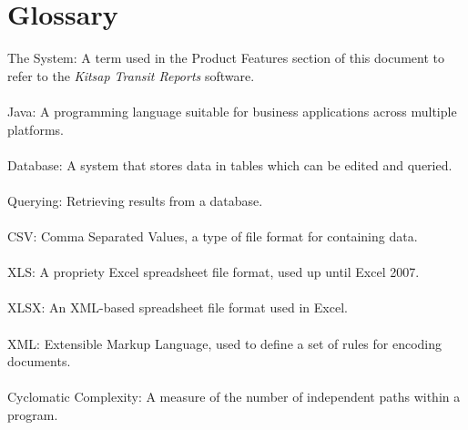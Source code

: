 \section{Glossary}
The System: A term used in the Product Features section of this document to refer to the \textit{Kitsap Transit Reports} software.\\\\
Java: A programming language suitable for business applications across multiple platforms.\\\\
Database: A system that stores data in tables which can be edited and queried.\\\\
Querying: Retrieving results from a database.\\\\
CSV: Comma Separated Values, a type of file format for containing data.\\\\
XLS: A propriety Excel spreadsheet file format, used up until Excel 2007.\\\\
XLSX: An XML-based spreadsheet file format used in Excel.\\\\
XML: Extensible Markup Language, used to define a set of rules for encoding documents.\\\\
Cyclomatic Complexity: A measure of the number of independent paths within a program.